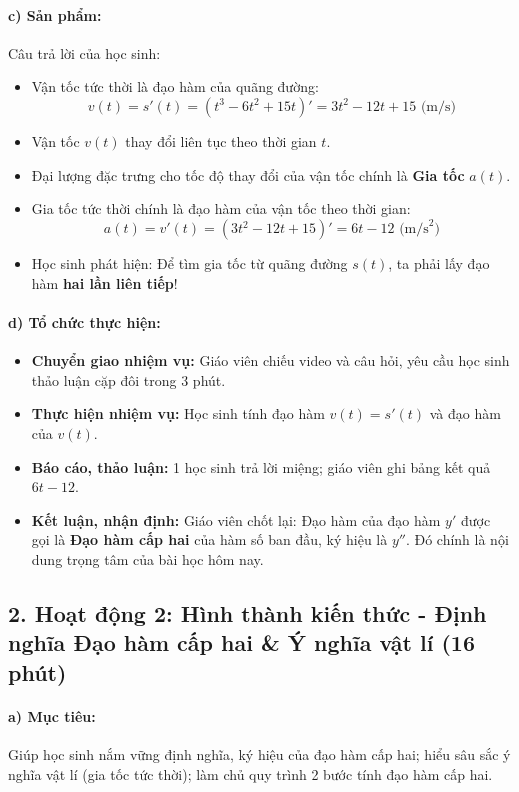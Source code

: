 \documentclass[12pt, a4paper]{article}
\begin{document}
\paragraph{c) Sản phẩm:} Câu trả lời của học sinh:
\begin{itemize}[leftmargin=0.8cm]
    \item Vận tốc tức thời là đạo hàm của quãng đường:
    $$v(t) = s'(t) = (t^3 - 6t^2 + 15t)' = 3t^2 - 12t + 15\text{ (m/s)}$$
    \item Vận tốc $v(t)$ thay đổi liên tục theo thời gian $t$.
    \item Đại lượng đặc trưng cho tốc độ thay đổi của vận tốc chính là \textbf{Gia tốc} $a(t)$.
    \item Gia tốc tức thời chính là đạo hàm của vận tốc theo thời gian:
    $$a(t) = v'(t) = (3t^2 - 12t + 15)' = 6t - 12\text{ (m/s}^2\text{)}$$
    \item Học sinh phát hiện: Để tìm gia tốc từ quãng đường $s(t)$, ta phải lấy đạo hàm \textbf{hai lần liên tiếp}!
\end{itemize}

\paragraph{d) Tổ chức thực hiện:}
\begin{itemize}[leftmargin=0.8cm]
    \item \textbf{Chuyển giao nhiệm vụ:} Giáo viên chiếu video và câu hỏi, yêu cầu học sinh thảo luận cặp đôi trong 3 phút.
    \item \textbf{Thực hiện nhiệm vụ:} Học sinh tính đạo hàm $v(t) = s'(t)$ và đạo hàm của $v(t)$.
    \item \textbf{Báo cáo, thảo luận:} 1 học sinh trả lời miệng; giáo viên ghi bảng kết quả $6t - 12$.
    \item \textbf{Kết luận, nhận định:} Giáo viên chốt lại: Đạo hàm của đạo hàm $y'$ được gọi là \textbf{Đạo hàm cấp hai} của hàm số ban đầu, ký hiệu là $y''$. Đó chính là nội dung trọng tâm của bài học hôm nay.
\end{itemize}

\subsection*{2. Hoạt động 2: Hình thành kiến thức - Định nghĩa Đạo hàm cấp hai & Ý nghĩa vật lí (16 phút)}

\paragraph{a) Mục tiêu:} Giúp học sinh nắm vững định nghĩa, ký hiệu của đạo hàm cấp hai; hiểu sâu sắc ý nghĩa vật lí (gia tốc tức thời); làm chủ quy trình 2 bước tính đạo hàm cấp hai.
\end{document}

